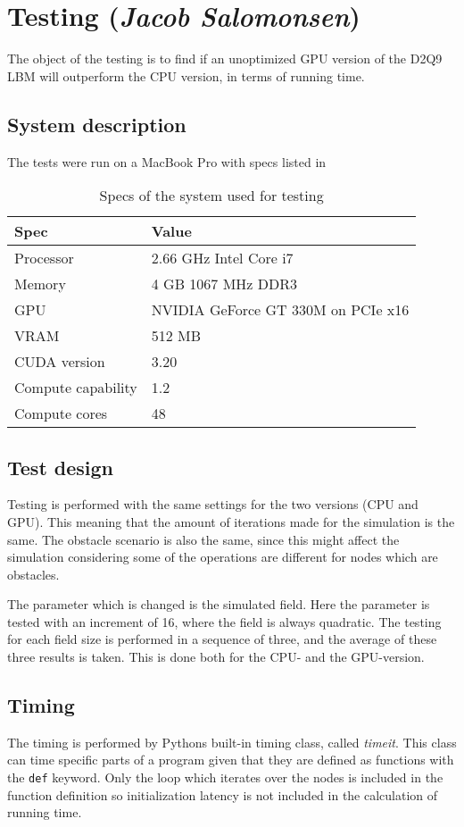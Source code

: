 \section{Testing (\textit{Jacob Salomonsen})}\label{testing}
The object of the testing is to find if an unoptimized GPU version of the D2Q9 LBM will outperform the CPU version, in terms of running time.

\subsection{System description}
The tests were run on a MacBook Pro with specs listed in 

\begin{table}[htb]
	\centering
	\begin{tabular}{ll}
		\toprule
		Spec & Value \\
		\midrule
		Processor & 2.66 GHz Intel Core i7 \\
		Memory & 4 GB 1067 MHz DDR3 \\
		GPU & NVIDIA GeForce GT 330M on PCIe x16\\
		VRAM & 512 MB\\
		CUDA version & 3.20\\
		Compute capability & 1.2\\
		Compute cores & 48\\		
		\bottomrule
	\end{tabular}
	\caption{Specs of the system used for testing}
	\label{specs}
\end{table}

\subsection{Test design}
Testing is performed with the same settings for the two versions (CPU and GPU). This meaning that the amount of iterations made for the simulation is the same. The obstacle scenario is also the same, since this might affect the simulation considering some of the operations are different for nodes which are obstacles. 

The parameter which is changed is the simulated field. Here the parameter is tested with an increment of 16, where the field is always quadratic. The testing for each field size is performed in a sequence of three, and the average of these three results is taken. This is done both for the CPU- and the GPU-version.

\subsection{Timing}
The timing is performed by Pythons built-in timing class, called \textit{timeit}. This class can time specific parts of a program given that they are defined as functions with the \texttt{def} keyword. Only the loop which iterates over the nodes is included in the function definition so initialization latency is not included in the calculation of running time.


